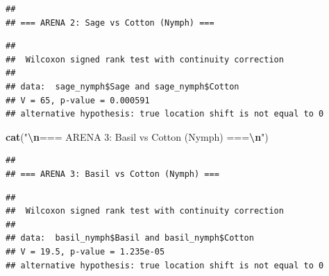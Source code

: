 \documentclass[
]{article}
\newenvironment{Shaded}{\begin{snugshade}}{\end{snugshade}}
\newcommand{\AttributeTok}[1]{\textcolor[rgb]{0.13,0.29,0.53}{#1}}
\newcommand{\ConstantTok}[1]{\textcolor[rgb]{0.56,0.35,0.01}{#1}}
\newcommand{\FunctionTok}[1]{\textcolor[rgb]{0.13,0.29,0.53}{\textbf{#1}}}
\newcommand{\NormalTok}[1]{#1}
\newcommand{\OtherTok}[1]{\textcolor[rgb]{0.56,0.35,0.01}{#1}}
\newcommand{\SpecialCharTok}[1]{\textcolor[rgb]{0.81,0.36,0.00}{\textbf{#1}}}
\newcommand{\StringTok}[1]{\textcolor[rgb]{0.31,0.60,0.02}{#1}}
\begin{document}
\begin{verbatim}
## 
## === ARENA 2: Sage vs Cotton (Nymph) ===
\end{verbatim}

\begin{Shaded}
\end{Shaded}

\begin{verbatim}
## 
##  Wilcoxon signed rank test with continuity correction
## 
## data:  sage_nymph$Sage and sage_nymph$Cotton
## V = 65, p-value = 0.000591
## alternative hypothesis: true location shift is not equal to 0
\end{verbatim}

\begin{Shaded}
\begin{Highlighting}[]
\FunctionTok{cat}\NormalTok{(}\StringTok{"}\SpecialCharTok{\textbackslash{}n}\StringTok{=== ARENA 3: Basil vs Cotton (Nymph) ===}\SpecialCharTok{\textbackslash{}n}\StringTok{"}\NormalTok{)}
\end{Highlighting}
\end{Shaded}

\begin{verbatim}
## 
## === ARENA 3: Basil vs Cotton (Nymph) ===
\end{verbatim}

\begin{Shaded}
\end{Shaded}

\begin{verbatim}
## 
##  Wilcoxon signed rank test with continuity correction
## 
## data:  basil_nymph$Basil and basil_nymph$Cotton
## V = 19.5, p-value = 1.235e-05
## alternative hypothesis: true location shift is not equal to 0
\end{verbatim}
\end{document}
